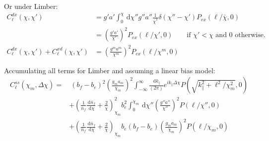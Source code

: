 \documentclass[onecolumn,prd,nofootinbib]{revtex4-1}
\newcommand{\ud}{\,\mathrm{d}}
\begin{document}
Or under Limber:
\begin{align}
C^{dx}_\ell(\chi,\chi')
    &=
    g'a'
    \int_0^\chi\ud\chi''g''a''
    \frac{1}{\bar\chi^2}
    \delta(\chi'' - \chi')
    P_{ex}(\ell/\bar\chi, 0)
    \\
    &=
    \left(\frac{g'a'}{\chi'}\right)^2
    P_{ex}(\ell/\chi', 0)
    \qquad \textrm{if $\chi' < \chi$ and 0 otherwise.}
    \\
C^{dx}_\ell(\chi,\chi') + C^{xd}_\ell(\chi,\chi')
    &=
    \left(\frac{g^ma^m}{\chi^m}\right)^2
    P_{ex}(\ell/\chi^m, 0)
\end{align}

Accumulating all terms for Limber and assuming a linear bias model:
\begin{align}
C^{ss}_\ell(\chi_m,\Delta\chi) =&~
    (b_f - b_e)^2 \left(\frac{g_m a_m}{\chi_m}\right)^2
        \int_{-\infty}^\infty\frac{\ud k_\parallel}{(2 \pi)} 
        e^{i k_\parallel \Delta\chi}
        P(\sqrt{k_\parallel^2 + \ell^2/\chi_m^2}, 0)
    \\ &+
    \left(\frac{1}{\bar{n}_f}\frac{\ud \bar{n}_f}{\ud \chi}
    + \frac{2}{\chi} \right)_{\chi_m}^2
    b_e^2 \int_0^{\chi_m}\ud\chi''
        \left(\frac{g''a''}{\chi''}\right)^2
        P(\ell/\chi'', 0)
    \\ &+
    \left(\frac{1}{\bar{n}_f}\frac{\ud \bar{n}_f}{\ud \chi}
    + \frac{2}{\chi} \right)_{\chi_m}
    b_e(b_f - b_e)\left(\frac{g_m a_m}{\chi_m}\right)^2
        P(\ell/\chi_m, 0)
\end{align}

\end{document}
